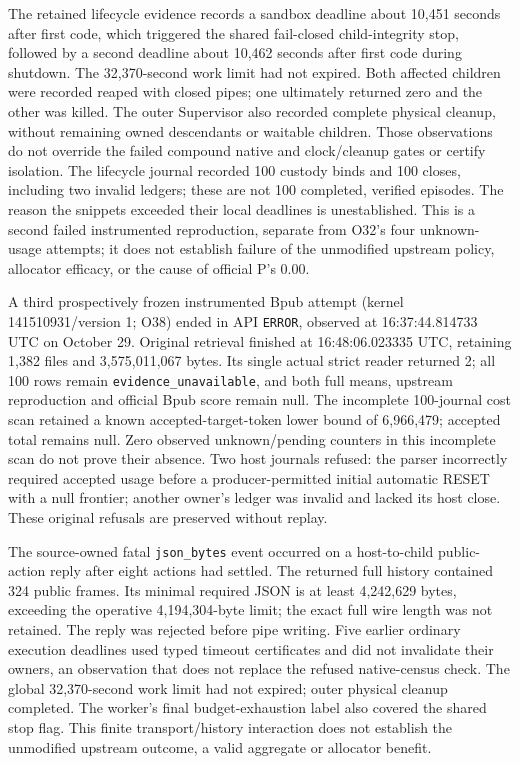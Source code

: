 \documentclass[11pt]{article}
\begin{document}
The retained lifecycle evidence records a sandbox deadline about 10,451 seconds after first code, which triggered the shared fail-closed child-integrity stop, followed by a second deadline about 10,462 seconds after first code during shutdown. The 32,370-second work limit had not expired. Both affected children were recorded reaped with closed pipes; one ultimately returned zero and the other was killed. The outer Supervisor also recorded complete physical cleanup, without remaining owned descendants or waitable children. Those observations do not override the failed compound native and clock/cleanup gates or certify isolation. The lifecycle journal recorded 100 custody binds and 100 closes, including two invalid ledgers; these are not 100 completed, verified episodes. The reason the snippets exceeded their local deadlines is unestablished. This is a second failed instrumented reproduction, separate from O32's four unknown-usage attempts; it does not establish failure of the unmodified upstream policy, allocator efficacy, or the cause of official P's 0.00.

A third prospectively frozen instrumented Bpub attempt (kernel 141510931/version 1; O38) ended in API \texttt{ERROR}, observed at 16:37:44.814733 UTC on October 29. Original retrieval finished at 16:48:06.023335 UTC, retaining 1,382 files and 3,575,011,067 bytes. Its single actual strict reader returned 2; all 100 rows remain \texttt{evidence\_unavailable}, and both full means, upstream reproduction and official Bpub score remain null. The incomplete 100-journal cost scan retained a known accepted-target-token lower bound of 6,966,479; accepted total remains null. Zero observed unknown/pending counters in this incomplete scan do not prove their absence. Two host journals refused: the parser incorrectly required accepted usage before a producer-permitted initial automatic RESET with a null frontier; another owner's ledger was invalid and lacked its host close. These original refusals are preserved without replay.

The source-owned fatal \texttt{json\_bytes} event occurred on a host-to-child public-action reply after eight actions had settled. The returned full history contained 324 public frames. Its minimal required JSON is at least 4,242,629 bytes, exceeding the operative 4,194,304-byte limit; the exact full wire length was not retained. The reply was rejected before pipe writing. Five earlier ordinary execution deadlines used typed timeout certificates and did not invalidate their owners, an observation that does not replace the refused native-census check. The global 32,370-second work limit had not expired; outer physical cleanup completed. The worker's final budget-exhaustion label also covered the shared stop flag. This finite transport/history interaction does not establish the unmodified upstream outcome, a valid aggregate or allocator benefit.
\end{document}
